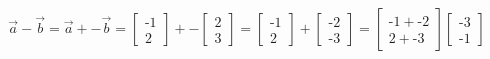 \documentclass[preview]{standalone}
\begin{document}
\begin{align*}
\vec{a} - \vec{b} = \vec{a} + - \vec{b} = \begin{bmatrix} \text{-}1 \\ 2 \end{bmatrix} + - \begin{bmatrix} 2 \\ 3 \end{bmatrix} = \begin{bmatrix} \text{-}1 \\ 2 \end{bmatrix} + \begin{bmatrix} \text{-}2 \\ \text{-}3 \end{bmatrix}= \begin{bmatrix} \text{-}1 + \text{-}2 \\ 2 + \text{-}3 \end{bmatrix} \begin{bmatrix} \text{-}3 \\ \text{-}1 \end{bmatrix}
\end{align*}
\end{document}
